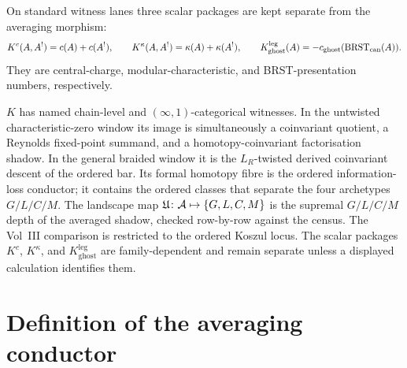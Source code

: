 On standard witness lanes three scalar packages are kept separate from
the averaging morphism:
\[
 K^c(A,A^!)=c(A)+c(A^!),\qquad
 K^\kappa(A,A^!)=\kappa(A)+\kappa(A^!),\qquad
 K_{\mathrm{ghost}}^{\mathrm{leg}}(A)
 =-c_{\mathrm{ghost}}(\mathrm{BRST}_{\mathrm{can}}(A)).
\]
They are central-charge, modular-characteristic, and BRST-presentation
numbers, respectively.

$K$ has named chain-level and $(\infty,1)$-categorical witnesses. In
the untwisted characteristic-zero window its image is simultaneously a
coinvariant quotient, a Reynolds fixed-point summand, and a
homotopy-coinvariant factorisation shadow. In the general braided
window it is the $L_R$-twisted derived coinvariant descent of the
ordered bar. Its formal homotopy fibre is the ordered
information-loss conductor; it contains the ordered classes that
separate the four archetypes $G/L/C/M$. The landscape map
$\mathfrak U\colon \mathcal{A}\mapsto\{G,L,C,M\}$ is the supremal
$G/L/C/M$ depth of the averaged shadow, checked row-by-row against the
census. The Vol~III
comparison is restricted to the ordered Koszul locus. The scalar
packages $K^c$, $K^\kappa$, and $K_{\mathrm{ghost}}^{\mathrm{leg}}$
are family-dependent and remain separate unless a displayed
calculation identifies them.

\section{Definition of the averaging conductor}
\label{sec:uc-definition}

